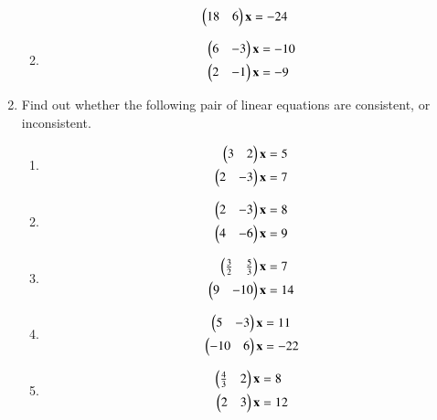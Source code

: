 \begin{enumerate}[label=\arabic*.,ref=\thesubsection.\theenumi]
\begin{enumerate}[itemsep=2pt]
\begin{align}
\begin{split}
\begin{pmatrix}18 & 6 \end{pmatrix}\mathbf{x}&=-24
\end{split}
\end{align}
\item
\begin{align}
\begin{split}
\begin{pmatrix}6 & -3 \end{pmatrix}\mathbf{x}&=-10
\\
\begin{pmatrix}2 & -1 \end{pmatrix}\mathbf{x}&=-9
\end{split}
\end{align}
\end{enumerate}
%
\item Find out whether the following pair of linear
equations are consistent, or inconsistent.
%
\begin{enumerate}[itemsep=2pt]
\item
\begin{align}
\begin{split}
\begin{pmatrix}3 & 2 \end{pmatrix}\mathbf{x}&=5
\\
\begin{pmatrix}2 & -3 \end{pmatrix}\mathbf{x}&=7
\end{split}
\end{align}
\item
\begin{align}
\begin{split}
\begin{pmatrix}2 & -3 \end{pmatrix}\mathbf{x}&=8
\\
\begin{pmatrix}4 & -6 \end{pmatrix}\mathbf{x}&=9
\end{split}
\end{align}
\item
\begin{align}
\begin{split}
\begin{pmatrix}\frac{3}{2} & \frac{5}{3} \end{pmatrix}\mathbf{x}&=7
\\
\begin{pmatrix}9 & -10 \end{pmatrix}\mathbf{x}&=14
\end{split}
\end{align}
\item
\begin{align}
\begin{split}
\begin{pmatrix}5 & -3 \end{pmatrix}\mathbf{x}&=11
\\
\begin{pmatrix}-10 & 6 \end{pmatrix}\mathbf{x}&=-22
\end{split}
\end{align}
\item
\begin{align}
\begin{split}
\myvec{\frac{4}{3} & 2 }\vec{x}&=8
\\
\myvec{2 & 3 }\vec{x}&=12
\end{split}

\end{align}
\end{enumerate}
\end{enumerate}
